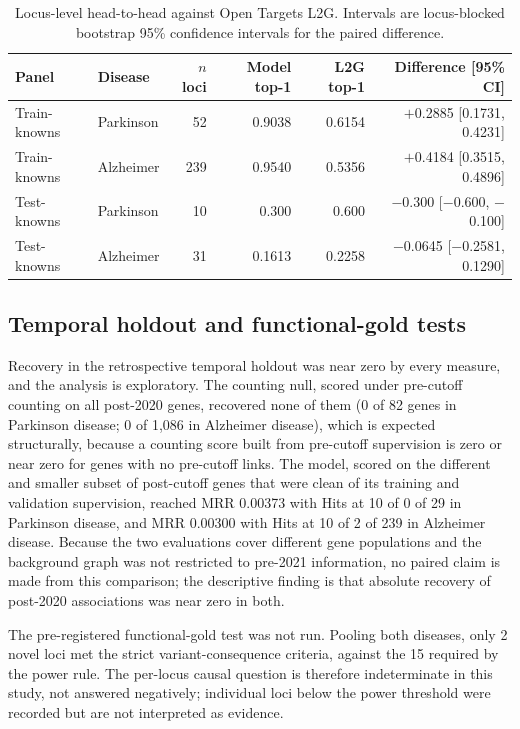 \documentclass[11pt]{article}
\begin{document}
\begin{table}[t]
\centering
\small
\caption{Locus-level head-to-head against Open Targets L2G. Intervals are locus-blocked bootstrap 95\% confidence intervals for the paired difference.}
\label{tab:h2h}
\begin{tabularx}{\textwidth}{@{}L L r r r r@{}}
\toprule
\textbf{Panel} & \textbf{Disease} & \textbf{$n$ loci} & \textbf{Model top-1} & \textbf{L2G top-1} & \textbf{Difference [95\% CI]} \\
\midrule
Train-knowns & Parkinson & 52 & 0.9038 & 0.6154 & $+$0.2885 [0.1731, 0.4231] \\
Train-knowns & Alzheimer & 239 & 0.9540 & 0.5356 & $+$0.4184 [0.3515, 0.4896] \\
Test-knowns & Parkinson & 10 & 0.300 & 0.600 & $-$0.300 [$-$0.600, $-$0.100] \\
Test-knowns & Alzheimer & 31 & 0.1613 & 0.2258 & $-$0.0645 [$-$0.2581, 0.1290] \\
\bottomrule
\end{tabularx}
\end{table}

\subsection{Temporal holdout and functional-gold tests}

Recovery in the retrospective temporal holdout was near zero by every measure, and the analysis is exploratory. The counting null, scored under pre-cutoff counting on all post-2020 genes, recovered none of them (0 of 82 genes in Parkinson disease; 0 of 1,086 in Alzheimer disease), which is expected structurally, because a counting score built from pre-cutoff supervision is zero or near zero for genes with no pre-cutoff links. The model, scored on the different and smaller subset of post-cutoff genes that were clean of its training and validation supervision, reached MRR 0.00373 with Hits at 10 of 0 of 29 in Parkinson disease, and MRR 0.00300 with Hits at 10 of 2 of 239 in Alzheimer disease. Because the two evaluations cover different gene populations and the background graph was not restricted to pre-2021 information, no paired claim is made from this comparison; the descriptive finding is that absolute recovery of post-2020 associations was near zero in both.

The pre-registered functional-gold test was not run. Pooling both diseases, only 2 novel loci met the strict variant-consequence criteria, against the 15 required by the power rule. The per-locus causal question is therefore indeterminate in this study, not answered negatively; individual loci below the power threshold were recorded but are not interpreted as evidence.
\end{document}

